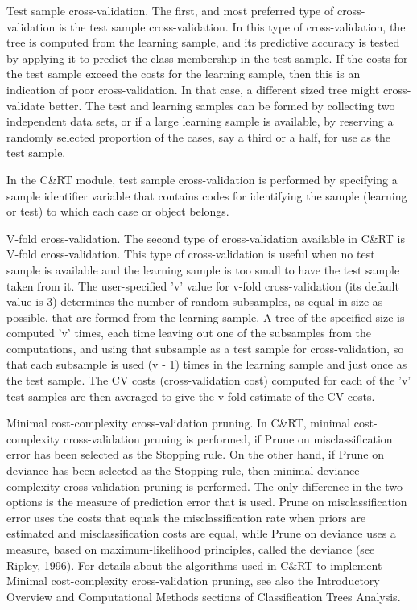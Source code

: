 Test sample cross-validation. The first, and most preferred type of cross-validation is the test sample cross-validation. In this type of cross-validation, the tree is computed from the learning sample, and its predictive accuracy is tested by applying it to predict the class membership in the test sample. If the costs for the test sample exceed the costs for the learning sample, then this is an indication of poor cross-validation. In that case, a different sized tree might cross-validate better. The test and learning samples can be formed by collecting two independent data sets, or if a large learning sample is available, by reserving a randomly selected proportion of the cases, say a third or a half, for use as the test sample.

In the C&RT module, test sample cross-validation is performed by specifying a sample identifier variable that contains codes for identifying the sample (learning or test) to which each case or object belongs.

V-fold cross-validation. The second type of cross-validation available in C&RT is V-fold cross-validation. This type of cross-validation is useful when no test sample is available and the learning sample is too small to have the test sample taken from it. The user-specified 'v' value for v-fold cross-validation (its default value is 3) determines the number of random subsamples, as equal in size as possible, that are formed from the learning sample. A tree of the specified size is computed 'v' times, each time leaving out one of the subsamples from the computations, and using that subsample as a test sample for cross-validation, so that each subsample is used (v - 1) times in the learning sample and just once as the test sample. The CV costs (cross-validation cost) computed for each of the 'v' test samples are then averaged to give the v-fold estimate of the CV costs.

Minimal cost-complexity cross-validation pruning. In C&RT, minimal cost-complexity cross-validation pruning is performed, if Prune on misclassification error has been selected as the Stopping rule. On the other hand, if Prune on deviance has been selected as the Stopping rule, then minimal deviance-complexity cross-validation pruning is performed. The only difference in the two options is the measure of prediction error that is used. Prune on misclassification error uses the costs that equals the misclassification rate when priors are estimated and misclassification costs are equal, while Prune on deviance uses a measure, based on maximum-likelihood principles, called the deviance (see Ripley, 1996). For details about the algorithms used in C&RT to implement Minimal cost-complexity cross-validation pruning, see also the Introductory Overview and Computational Methods sections of Classification Trees Analysis.

